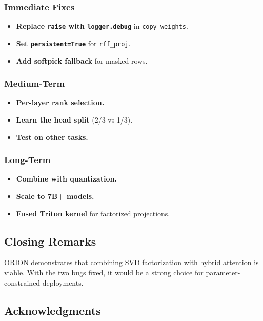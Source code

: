 \subsubsection{Immediate Fixes}

\begin{itemize}
\item \textbf{Replace \texttt{raise} with \texttt{logger.debug}} in \texttt{copy\_weights}.
\item \textbf{Set \texttt{persistent=True}} for \texttt{rff\_proj}.
\item \textbf{Add softpick fallback} for masked rows.

\end{itemize}
\subsubsection{Medium-Term}

\begin{itemize}
\item \textbf{Per-layer rank selection.}
\item \textbf{Learn the head split} (2/3 vs 1/3).
\item \textbf{Test on other tasks.}

\end{itemize}
\subsubsection{Long-Term}

\begin{itemize}
\item \textbf{Combine with quantization.}
\item \textbf{Scale to 7B+ models.}
\item \textbf{Fused Triton kernel} for factorized projections.

\end{itemize}
\subsection{Closing Remarks}

ORION demonstrates that combining SVD factorization with hybrid attention 
is viable. With the two bugs fixed, it would be a strong choice for 
parameter-constrained deployments.

\subsection{Acknowledgments}

